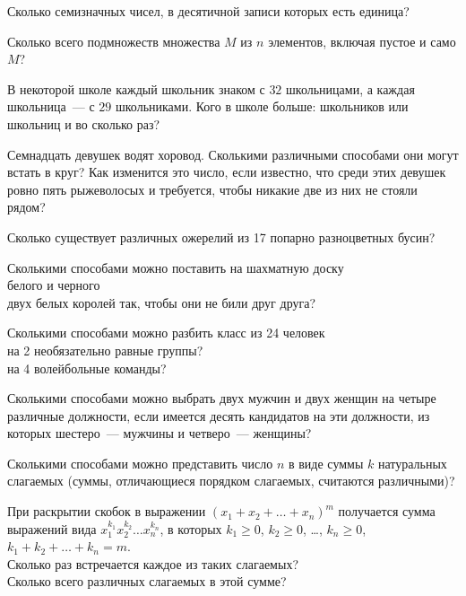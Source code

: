 

\setcounter{footnote}{0}

\begin{problems}

\item
Сколько семизначных чисел, в десятичной записи которых есть единица?

\item
Сколько всего подмножеств множества $M$ из $n$ элементов, включая пустое и само
$M$?

\item
В некоторой школе каждый школьник знаком с $32$ школьницами, а каждая
школьница~--- с $29$ школьниками.
Кого в школе больше: школьников или школьниц и во сколько раз?

\item
Семнадцать девушек водят хоровод.
Сколькими различными способами они могут встать в круг?
Как изменится это число, если известно, что среди этих девушек ровно пять
рыжеволосых и требуется, чтобы никакие две из них не стояли рядом?

\item
Сколько существует различных ожерелий из 17 попарно разноцветных бусин?

\item
Сколькими способами можно поставить на шахматную доску
\\
\sbp белого и черного
\\
\sbp двух белых королей так, чтобы они не били друг друга?

\item
Сколькими способами можно разбить класс из 24 человек
\\
\sbp на 2 необязательно равные группы?
\\
\sbp на 4 волейбольные команды?

\item
Сколькими способами можно выбрать двух мужчин и двух женщин на четыре различные
должности, если имеется десять кандидатов на эти должности, из которых
шестеро~--- мужчины и четверо~--- женщины?

\item
Сколькими способами можно представить число $n$ в виде суммы $k$ натуральных
слагаемых (суммы, отличающиеся порядком слагаемых, считаются различными)?

\item
При раскрытии скобок в выражении
$\left(x_1 + x_2 + \ldots + x_n\right)^m$
получается сумма выражений вида
$x_1^{k_1} x_2^{k_2} \ldots x_n^{k_n}$,
в которых
$k_1 \geq 0$, $k_2 \geq 0$, \ldots, $k_n \geq 0$,
$k_1 + k_2 + \ldots + k_n = m$.
\\
\sbp Сколько раз встречается каждое из таких слагаемых?
\\
\sbp Сколько всего различных слагаемых в этой сумме?


\end{problems}

